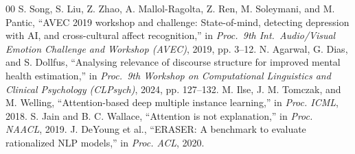 \documentclass[conference]{IEEEtran}
\begin{document}
\begin{thebibliography}{00}
S. Song, S. Liu, Z. Zhao, A. Mallol-Ragolta, Z. Ren, M. Soleymani, and
M. Pantic, ``AVEC 2019 workshop and challenge: State-of-mind, detecting
depression with AI, and cross-cultural affect recognition,'' in \emph{Proc.\ 9th
Int.\ Audio/Visual Emotion Challenge and Workshop (AVEC)}, 2019, pp. 3--12.
 N. Agarwal, G. Dias, and S. Dollfus, ``Analysing
relevance of discourse structure for improved mental health estimation,'' in
\emph{Proc.\ 9th Workshop on Computational Linguistics and Clinical Psychology
(CLPsych)}, 2024, pp. 127--132.
 M. Ilse, J. M. Tomczak, and M. Welling, ``Attention-based
deep multiple instance learning,'' in \emph{Proc. ICML}, 2018.
 S. Jain and B. C. Wallace, ``Attention is not explanation,''
in \emph{Proc. NAACL}, 2019.
 J. DeYoung et al., ``ERASER: A benchmark to evaluate
rationalized NLP models,'' in \emph{Proc. ACL}, 2020.
\end{thebibliography}
\end{document}
